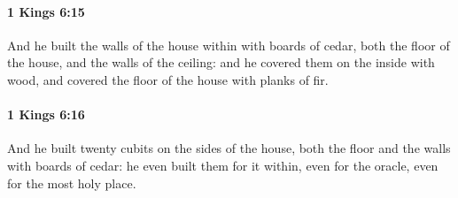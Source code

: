 		\paragraph{1 Kings 6:15} %
			\label{1KINGS-6-15}

			And he built the walls of the house within with boards of cedar, both the floor of the house, and the walls of the ceiling: and he covered them on the inside with wood, and covered the floor of the house with planks of fir.


		\paragraph{1 Kings 6:16} %
			\label{1KINGS-6-16}

			And he built twenty cubits on the sides of the house, both the floor and the walls with boards of cedar: he even built them for it within, even for the oracle, even for the most holy place.

